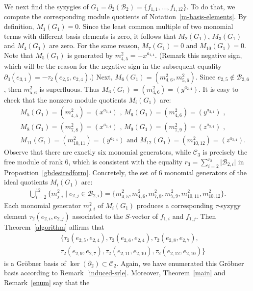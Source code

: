 \documentclass[ALCO]{cedram}
\newcommand{\mcb}{\mbox{$\mathcal{B}$}}
\newcommand{\mcc}{\mbox{$\mathcal{C}$}}
\newcommand{\dif}{\mbox{$\partial$}}
\begin{document}
We next find the syzygies of $G_1=\dif_2(\mcb_2)=\{f_{1,1},\ldots,
f_{1,12}\}$. To do that, we compute the corresponding module quotients
of Notation~\ref{m-basis-elements}. By definition, $M_1(G_1)=0$. Since
the least common multiple of two monomial terms with different basis
elements is zero, it follows that $M_2(G_1)$, $M_3(G_1)$ and
$M_4(G_1)$ are zero. For the same reason, $M_7(G_1)=0$ and
$M_{10}(G_1)=0$.  Note that $M_5(G_1)$ is generated by
$m^2_{4,5}=-x^{a_{1,4}}$. (Remark this negative sign, which will be
the reason for the negative sign in the subsequent equality
$\dif_3(e_{3,1})=-\tau_2(e_{2,5},e_{2,4})$.) Next,
$M_6(G_1)=(m^2_{4,6},m^2_{5,6})$. Since $e_{2,5}\not\in\mcb_{2,6}$,
then $m^2_{5,6}$ is superfluous. Thus
$M_6(G_1)=(m^2_{4,6})=(y^{a_{2,4}})$. It is easy to check that the
nonzero module quotients $M_i(G_1)$ are:
\begin{eqnarray*}
&&M_5(G_1)=(m^2_{4,5})=(x^{a_{1,4}})\mbox{ , }
M_6(G_1)=(m^2_{4,6})=(y^{a_{2,4}})\mbox{ , }\\
&&M_8(G_1)=(m^2_{7,8})=(x^{a_{1,4}})\mbox{ , }
M_9(G_1)=(m^2_{7,9})=(z^{a_{3,4}})\mbox{ , }\\
&&M_{11}(G_1)=(m^2_{10,11})=(y^{a_{2,4}})\mbox{ and }
M_{12}(G_1)=(m^2_{10,12})=(z^{a_{3,4}}).
\end{eqnarray*}
Observe that there are exactly six monomial generators, while $\mcc_3$
is precisely the free module of rank $6$, which is consistent with the
equality $r_3=\sum_{i=2}^{r_2}\lvert\mcb_{2,i}\rvert$ in
Proposition~\ref{gbdesiredform}. Concretely, the set of $6$ monomial
generators of the ideal quotients $M_i(G_1)$ are:
\begin{eqnarray*}
\bigcup_{i=2}^{12}\{m^2_{j,i}\mid e_{2,j}\in\mcb_{2,i}\}=\{
m^2_{4,5},m^2_{4,6},m^2_{7,8},m^2_{7,9},m^2_{10,11},m^2_{10,12}\}.
\end{eqnarray*}
Each monomial generator $m^2_{j,i}$ of $M_i(G_1)$ produces a
corresponding $\tau$-syzygy element $\tau_2(e_{2,i},e_{2,j})$
associated to the $S$-vector of $f_{1,i}$ and $f_{1,j}$. Then
Theorem~\ref{algorithm} affirms that
\begin{eqnarray*}
&& \{\tau_2(e_{2,5},e_{2,4}),\tau_2(e_{2,6},e_{2,4}),\tau_2(e_{2,8},e_{2,7}),
\\ && \tau_2(e_{2,9},e_{2,7}),\tau_2(e_{2,11},e_{2,10}),\tau_2(e_{2,12},e_{2,10})\}
\end{eqnarray*}
is a Gr\"obner basis of $\ker(\dif_2)\subset\mcc_2$. Again, we have
enumerated this Gr\"obner basis according to Remark~\ref{induced-srle}.
Moreover, Theorem~\ref{main} and Remark~\ref{enum} say that the
\end{document}
